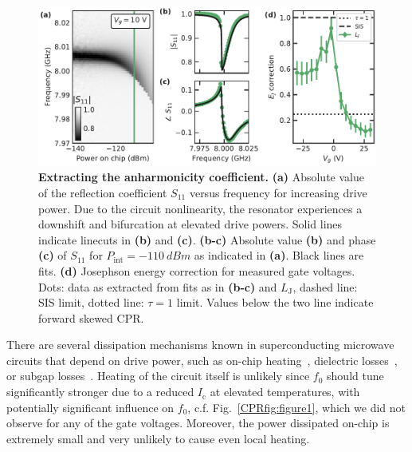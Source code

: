 \begin{figure}[t]
	\centering
	\includegraphics[width=\linewidth]{chapter-gJJ-CPR/figs/Figure3}
	\caption{
		\textbf{Extracting the anharmonicity coefficient.}
		\textbf{(a)} Absolute value of the reflection coefficient $S_{11}$ versus frequency for increasing drive power.
		Due to the circuit nonlinearity, the resonator experiences a downshift and bifurcation at elevated drive powers.
		Solid lines indicate linecuts in \textbf{(b)} and \textbf{(c)}.
		\textbf{(b-c)} Absolute value \textbf{(b)} and phase \textbf{(c)} of $S_{11}$ for $P_\text{int}=\SI{-110}{dBm}$ as indicated in \textbf{(a)}.
		Black lines are fits.
		\textbf{(d)} Josephson energy correction for measured gate voltages.
		Dots: data as extracted from fits as in \textbf{(b-c)} and $L_\text{J}$, dashed line: SIS limit, dotted line: $\tau=1$ limit.
		Values below the two line indicate forward skewed CPR.
	}
	\label{CPRfig:figure3}
\end{figure}

There are several dissipation mechanisms known in superconducting microwave circuits that depend on drive power, such as on-chip heating~\cite{portisPowerinducedSwitchingHTS1991,heinFundamentalLimitsLinear1997,wosikPowerHandlingCapabilities1997}, dielectric losses~\cite{martinisDecoherenceJosephsonQubits2005c,oconnellMicrowaveDielectricLoss2008a,gunnarssonDielectricLossesMultilayer2013,lisenfeldElectricFieldSpectroscopy2019}, or subgap losses~\cite{dassonnevilleDissipationSupercurrentFluctuations2013,ferrierPhasedependentAndreevSpectrum2013,dassonnevilleCoherenceenhancedPhasedependentDissipation2018}.
%
Heating of the circuit itself is unlikely since $f_0$ should tune significantly stronger due to a reduced $I_\text{c}$ at elevated temperatures, with potentially significant influence on $f_0$, c.f. Fig.~\ref{CPRfig:figure1}, which we did not observe for any of the gate voltages.
%
Moreover, the power dissipated on-chip is extremely small and very unlikely to cause even local heating.

